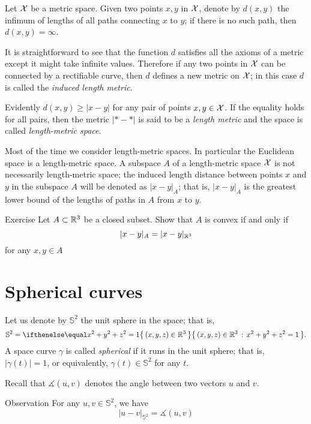 Let $\mathcal{X}$ be a metric space.
Given two points $x,y$ in $\mathcal{X}$, denote by $d(x,y)$ the infimum of lengths of all paths connecting $x$ to $y$; if there is no such path, then $d(x,y)=\infty$.

It is straightforward to see that the function $d$ satisfies all the axioms of a metric except it might take infinite values.
Therefore if any two points in $\mathcal{X}$ can be connected by a rectifiable curve, then $d$ defines a new metric on $\mathcal{X}$;
in this case $d$ is called the \emph{induced length metric}.

Evidently $d(x,y)\ge |x-y|$ for any pair of points $x,y\in \mathcal{X}$.
If the equality holds for all pairs, then the metric $|{*}-{*}|$ is said to be a \emph{length metric} and the space is called \emph{length-metric space}.

Most of the time we consider length-metric spaces.
In particular the Euclidean space is a length-metric space.
A subspace $A$ of a length-metric space $\mathcal{X}$ is not necessarily length-metric space;
the induced length distance between points $x$ and $y$ in the subspace $A$ will be denoted as $|x-y|_A$;
that is, $|x-y|_A$ is the greatest lower bound of the lengths of paths in $A$ from $x$ to $y$.

\begin{thm}{Exercise}\label{ex:intrinsic-convex}
Let $A\subset \mathbb{R}^3$ be a closed subset.
Show that $A$ is convex if and only if
\[|x-y|_A=|x-y|_{\mathbb{R}^3}\]
for any $x,y\in A$
\end{thm}


\section{Spherical curves}

Let us denote by $\mathbb{S}^2$ the unit sphere in the space; that is,
\[\mathbb{S}^2=\set{(x,y,z)\in\RR^3}{x^2+y^2+z^2=1}.\]
A space curve $\gamma$ is called \emph{spherical} if it runs in the unit sphere;
that is, $|\gamma(t)|=1$, or equivalently, $\gamma(t)\in\mathbb{S}^2$  for any $t$.

Recall that $\measuredangle(u,v)$ denotes the angle between two vectors $u$ and $v$.

\begin{thm}{Observation}
For any $u,v\in \mathbb{S}^2$, we have
\[|u-v|_{\mathbb{S}^2}=\measuredangle(u,v)\]

\end{thm}

